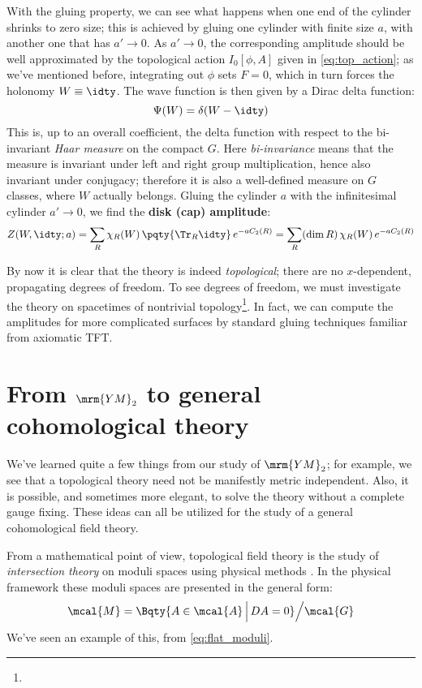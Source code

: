 \documentclass[a4paper
	,10pt
]{article}
\newcommand{\YM}{{\ensuremath{\mrm{YM}_2}}\xspace}
\begin{document}
	With the gluing property, we can see what happens when one end of the cylinder shrinks to zero size; this is achieved by gluing one cylinder with finite size $a$, with another one that has $a'\to 0$. As $a'\to 0$, the corresponding amplitude should be well approximated by the topological action $I_0[\phi,A]$ given in \eqref{eq:top_action}; as we've mentioned before, integrating out $\phi$ sets $F = 0$, which in turn forces the holonomy $W \equiv \idty$. The wave function is then given by a Dirac delta function:
	\begin{equation}
		\Psi(W) = \delta(W - \idty)
	\end{equation}
	This is, up to an overall coefficient, the delta function with respect to the bi-invariant \textit{Haar measure} on the compact $G$. Here \textit{bi-invariance} means that the measure is invariant under left and right group multiplication, hence also invariant under conjugacy; therefore it is also a well-defined measure on $G$ classes, where $W$ actually belongs. Gluing the cylinder $a$ with the infinitesimal cylinder $a'\to 0$, we find the \textbf{disk (cap) amplitude}:
	\begin{equation}
		Z(W,\idty;a)
		= \sum_R \chi_R(W)\,
			\pqty{\Tr_R \idty}\,
			e^{-aC_2(R)}
		= \sum_R (\dim R)\, \chi_R(W)\,
			e^{-aC_2(R)}
	\end{equation}
	
	By now it is clear that the theory is indeed \textit{topological}; there are no $x$-dependent, propagating degrees of freedom. To see degrees of freedom, we must investigate the theory on spacetimes of nontrivial topology\footnote{}. In fact, we can compute the amplitudes for more complicated surfaces by standard gluing techniques familiar from axiomatic TFT. 

\section{From \YM to general cohomological theory}
	We've learned quite a few things from our study of \YM; for example, we see that a topological theory need not be manifestly metric independent. Also, it is possible, and sometimes more elegant, to solve the theory without a complete gauge fixing. These ideas can all be utilized for the study of a general cohomological field theory.
	
	From a mathematical point of view, topological field theory is the study of \textit{intersection theory} on moduli spaces using physical methods \cite{Cordes:1994fc,Witten:1990bs}. In the physical framework these moduli spaces are presented in the general form:
	\begin{equation}
		\mcal{M}
		= \Bqty{
				A\in \mcal{A}
				\,\Big|\,
				DA = 0
			} \Big/ \mcal{G}
	\end{equation}
	We've seen an example of this, from \eqref{eq:flat_moduli}. 
	
\end{document}
